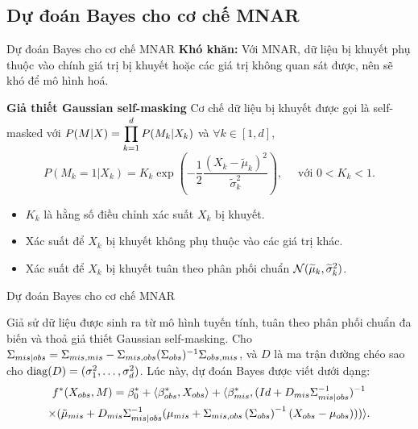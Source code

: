 \documentclass[aspectratio=169, 10pt]{beamer} %
\begin{document}
\subsection{Dự đoán Bayes cho cơ chế MNAR}
\begin{frame}{Dự đoán Bayes cho cơ chế MNAR}
    \textbf{Khó khăn:} 
    Với MNAR, dữ liệu bị khuyết phụ thuộc vào chính giá trị bị khuyết hoặc các giá trị không quan sát được, nên sẽ khó để mô hình hoá.

    \pause
    \textbf{Giả thiết Gaussian self-masking}
    Cơ chế dữ liệu bị khuyết được gọi là self-masked với 
    $P(M|X) = \displaystyle\prod_{k=1}^d P(M_k|X_k)$ và $\forall k \in [1,d]$,
    \[
        P(M_{k} = 1 | X_{k}) = K_{k} \exp\left( -\frac{1}{2} \frac{(X_{k} - \widetilde{\mu}_{k})^{2}}{\widetilde{\sigma}_{k}^{2}} \right), \quad \text{ với } 0 < K_{k} < 1.
    \]
    \begin{itemize}
        \item $K_k$ là hằng số điều chỉnh xác suất $X_k$ bị khuyết.
        \item Xác suất để $X_k$ bị khuyết không phụ thuộc vào các giá trị khác.
        \item Xác suất để $X_k$ bị khuyết 
        tuân theo phân phối chuẩn $\mathcal{N}(\widetilde{\mu}_{k}, \widetilde{\sigma}_{k}^2 )$.
    \end{itemize}
\end{frame}

\begin{frame}{Dự đoán Bayes cho cơ chế MNAR}
    \begin{prop}
    Giả sử dữ liệu được sinh ra từ mô hình tuyến tính, tuân theo phân phối chuẩn đa biến và thoả giả thiết Gaussian self-masking. 
    Cho $\Sigma_{mis|obs} = \Sigma_{mis,mis} - \Sigma_{mis,obs} (\Sigma_{obs})^{-1} \Sigma_{obs,mis}$,
    và $D$ là ma trận đường chéo sao cho $\operatorname{diag}(D) = (\sigma_1^2, \dots, \sigma_d^2)$. Lúc này, dự đoán Bayes được viết dưới dạng:
    \begin{multline*}\label{eq:gaussian_bayes_predictor}
        f^{*}(X_{obs}, M) = 
        \beta_{0}^{*} + \langle\beta_{obs}^{*}, X_{obs}\rangle 
        + \langle\beta_{mis}^{*},(Id + D_{mis} \Sigma_{mis|obs}^{-1})^{-1} \\
        \times (\tilde{\mu}_{mis} + D_{mis}\Sigma_{mis|obs}^{-1}(\mu_{mis} + 
        \Sigma_{mis,obs}\left(\Sigma_{obs}\right)^{-1} (X_{obs}-\mu_{obs}))) \rangle.
    \end{multline*}
    \end{prop}
\end{frame}
\end{document}
